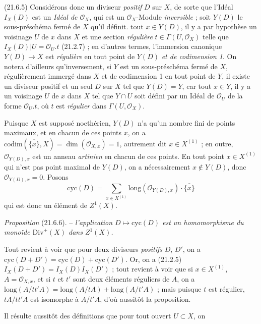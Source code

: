 \documentclass[11pt,a4paper]{article}
\begin{document}


(21.6.5) Considérons donc un diviseur \emph{positif} $D$ sur $X$, de sorte
que l'Idéal  $I_{X}(D)$ est un \emph{Idéal de
$\mathcal{O}_{X}$}, qui est un $\mathcal{O}_{X}$-Module \emph{inversible} ;
soit $Y(D)$ le sous-préschéma fermé de $X$ qu'il définit. \struck{\ill{}}
 tout $x \in Y(D)$, \struck{\ill{}} il y a par hypothèse un
voisinage  $U$ de $x$ dans $X$ et une section \emph{régulière}
$t \in \Gamma(U,\mathcal{O}_{X})$ telle que $I_{X}(D)|U =
\mathcal{O}_{U}.t$ (21.2.7) ; en d'autres termes, l'immersion canonique
$Y(D) \to X$ est \emph{régulière}  en tout point de $Y(D)$
\emph{et de codimension 1}. On notera d'ailleurs qu'inversement, si $Y$ est
un sous-préschéma fermé de $X$, régulièrement immergé dans $X$ et
\struck{\ill{}} de codimension 1 en tout point de $Y$, il existe un diviseur
positif et un seul \struck{\ill{}} $D$ sur $X$ tel que $Y(D) = Y$, car
 \struck{\ill{}} tout $x \in Y$, il y a un voisinage $U$ de $x$
dans $X$ tel que $Y \cap U$ soit défini par un Idéal de $\mathcal{O}_{U}$ de
la forme $\mathcal{O}_{U}.t$, où $t$ est \emph{régulier} dans
$\Gamma(U,\mathcal{O}_{X})$.

Puisque $X$ est supposé noethérien, $Y(D)$ n'a qu'un nombre fini de points
maximaux, et en chacun de ces points $x$, on a $\mathrm{codim}(\overline{\{x\}},X)
= \dim(\mathcal{O}_{X,x}) = 1$, autrement dit $x \in X^{(1)}$ ;
\struck{\ill{}} en outre, $\mathcal{O}_{Y(D),x}$ est un anneau
\emph{artinien} en chacun de ces points. En tout point $x \in X^{(1)}$ qui
n'est pas point maximal de $Y(D)$, on a nécessairement $x \notin Y(D)$, donc
$\mathcal{O}_{Y(D),x} = 0$. Posons
\[
\mathrm{cyc}(D) = \sum_{x \in X^{(1)}} \mathrm{long}(\mathcal{O}_{Y(D),x})
\cdot \overline{\{x\}}
\tag{21.6.5.1}
\]
qui est donc un élément de $Z^{1}(X)$.

\emph{Proposition} (21.6.6). -- 
\emph{l'application $D \mapsto \mathrm{cyc}(D)$ est un homomorphisme du
monoïde $\mathrm{Div}^{+}(X)$ dans $Z^{1}(X)$.}

Tout revient à voir que pour deux diviseurs \emph{positifs} $D$, $D'$, on a
$\mathrm{cyc}(D+D') = \mathrm{cyc}(D) + \mathrm{cyc}(D')$. Or, on a (21.2.5)
$I_{X}(D+D') = I_{X}(D) I_{X}(D')$ ; tout revient à voir que si $x \in
X^{(1)}$,  $A = \mathcal{O}_{X,x}$, et si $t$ et $t'$ sont
deux éléments réguliers de $A$, on a $\mathrm{long}(A/tt'A) =
\mathrm{long}(A/tA) + \mathrm{long}(A/t'A)$ ; mais puisque \struck{\ill{}}
$t$ est régulier, $tA/tt'A$ est isomorphe à $A/t'A$, d'où \struck{\ill{}}
aussitôt la proposition.

Il résulte aussitôt des définitions que pour tout ouvert $U \subset X$, on
\end{document}
